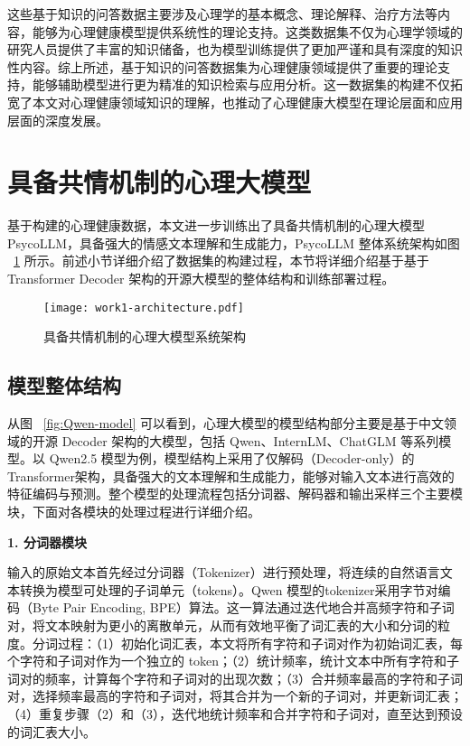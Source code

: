 这些基于知识的问答数据主要涉及心理学的基本概念、理论解释、治疗方法等内容，能够为心理健康模型提供系统性的理论支持。这类数据集不仅为心理学领域的研究人员提供了丰富的知识储备，也为模型训练提供了更加严谨和具有深度的知识性内容。综上所述，基于知识的问答数据集为心理健康领域提供了重要的理论支持，能够辅助模型进行更为精准的知识检索与应用分析。这一数据集的构建不仅拓宽了本文对心理健康领域知识的理解，也推动了心理健康大模型在理论层面和应用层面的深度发展。

\section{具备共情机制的心理大模型}

基于构建的心理健康数据，本文进一步训练出了具备共情机制的心理大模型 PsycoLLM，具备强大的情感文本理解和生成能力，PsycoLLM 整体系统架构如图 ~\ref{fig:work1-architecture} 所示。前述小节详细介绍了数据集的构建过程，本节将详细介绍基于基于 Transformer Decoder 架构的开源大模型的整体结构和训练部署过程。

\begin{figure}[ht]
  \centering
  \texttt{[image: work1-architecture.pdf]}
  \caption{具备共情机制的心理大模型系统架构}
  \label{fig:work1-architecture}
\end{figure}

\subsection{模型整体结构}

从图 ~\ref{fig:Qwen-model} 可以看到，心理大模型的模型结构部分主要是基于中文领域的开源 Decoder 架构的大模型，包括 Qwen、InternLM、ChatGLM 等系列模型。以 Qwen2.5 模型为例，模型结构上采用了仅解码（Decoder-only）的Transformer架构，具备强大的文本理解和生成能力，能够对输入文本进行高效的特征编码与预测。整个模型的处理流程包括分词器、解码器和输出采样三个主要模块，下面对各模块的处理过程进行详细介绍。

\textbf{1. 分词器模块}

输入的原始文本首先经过分词器（Tokenizer）进行预处理，将连续的自然语言文本转换为模型可处理的子词单元（tokens）。Qwen 模型的tokenizer采用字节对编码（Byte Pair Encoding, BPE）算法。这一算法通过迭代地合并高频字符和子词对，将文本映射为更小的离散单元，从而有效地平衡了词汇表的大小和分词的粒度。分词过程：（1）初始化词汇表，本文将所有字符和子词对作为初始词汇表，每个字符和子词对作为一个独立的 token；（2）统计频率，统计文本中所有字符和子词对的频率，计算每个字符和子词对的出现次数；（3）合并频率最高的字符和子词对，选择频率最高的字符和子词对，将其合并为一个新的子词对，并更新词汇表；（4）重复步骤（2）和（3），迭代地统计频率和合并字符和子词对，直至达到预设的词汇表大小。

